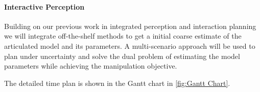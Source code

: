 \paragraph{Interactive Perception} Building on our previous work in integrated perception and interaction planning we will integrate off-the-shelf methods to get a initial coarse estimate of the articulated model and its parameters. A multi-scenario approach will be used to plan under uncertainty and solve the dual problem of estimating the model parameters while achieving the manipulation objective.  

\medskip
The detailed time plan is shown in the Gantt chart in \cref{fig:Gantt Chart}.

